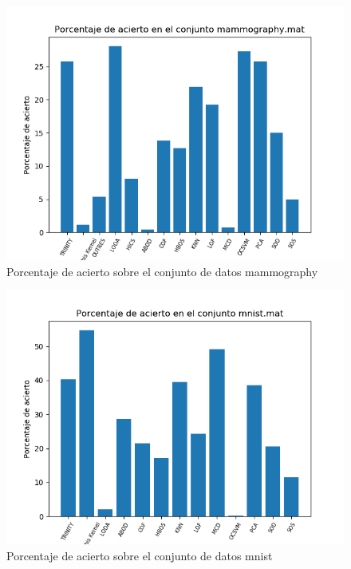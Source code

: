 \begin{figure}[H]
	\centering
	\label{mammography_accuracy}
	\includegraphics[scale=0.7]{imagenes/imgs-exp1/accuracy/mammography}
	\caption{Porcentaje de acierto sobre el conjunto de datos mammography}
\end{figure}

\begin{figure}[H]
	\centering
	\label{mnist_accuracy}
	\includegraphics[scale=0.7]{imagenes/imgs-exp1/accuracy/mnist}
	\caption{Porcentaje de acierto sobre el conjunto de datos mnist}
\end{figure}

